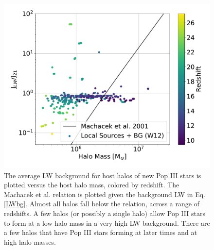 \documentclass[a4paper,fleqn,usenatbib]{mnras}
\begin{document}
\begin{figure}
	\includegraphics[width=\columnwidth]{images/jlw_mass_machacek_total.pdf}
    \caption{The average LW background for host halos of new Pop III stars is plotted versus the host halo mass, colored by redshift. The Machacek et al. relation is plotted given the background LW in Eq. \ref{LWbg}. Almost all halos fall below the relation, across a range of redshifts. A few halos (or possibly a single halo) allow Pop III stars to form at a low halo mass in a very high LW background. There are a few halos that have Pop III stars forming at later times and at high halo masses.}
    \label{fig:jlw_mass_machacek}{}
\end{figure}
\end{document}
